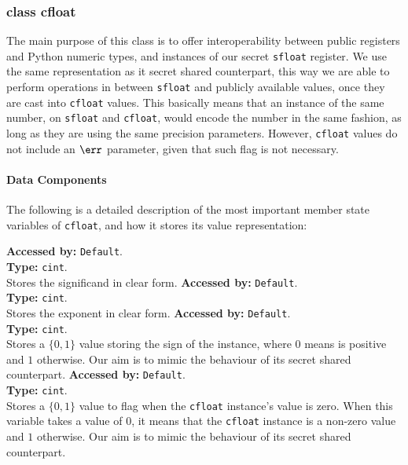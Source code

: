 \subsubsection{class cfloat}
The main purpose of this class is to offer interoperability between public registers 
and Python numeric types, and instances of our secret \verb|sfloat| register. 
We use the same representation as it secret shared counterpart, 
this way we are able to perform operations in between \verb|sfloat| and publicly available values, 
once they are cast into \verb|cfloat| values.
This basically means that an instance of the same number, on \verb|sfloat| and \verb|cfloat|, 
would  encode the number in the same fashion, 
as long as they are using the same precision parameters. 
However, \verb|cfloat| values do not include an $\err$ parameter, 
given that such flag is not necessary.

\paragraph{Data Components}
		The following is a detailed description of the most important member state variables of \verb|cfloat|, and how it stores its value representation:
		
		\textbf{Accessed by:} \verb|Default|.\\
		\textbf{Type:} \verb|cint|.\\
		Stores the significand in clear form.
		\textbf{Accessed by:} \verb|Default|.\\
		\textbf{Type:} \verb|cint|.\\
		Stores the  exponent in clear form.
		\textbf{Accessed by:} \verb|Default|.\\
		\textbf{Type:} \verb|cint|.\\
		Stores a $\{0,1\}$ value storing the sign of the instance, 
		where $0$ means is positive and $1$ otherwise. 
		Our aim is to mimic the behaviour of its secret shared counterpart.
		\textbf{Accessed by:} \verb|Default|.\\
		\textbf{Type:} \verb|cint|.\\
		Stores a $\{0,1\}$ value to flag when the \verb|cfloat| 
		instance's value is zero. 
		When this variable takes a value of $0$, it means that the \verb|cfloat| 
		instance is a non-zero value and $1$ otherwise. 
		Our aim is to mimic the behaviour of its secret shared counterpart.

